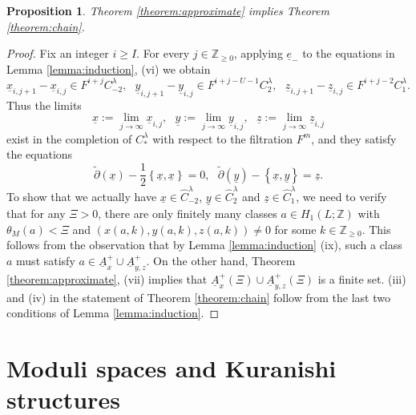\documentclass[a4paper]{article}
\newtheorem{proposition}[theorem]{Proposition}
\numberwithin{equation}{section}
\begin{document}
\begin{proposition}
Theorem \ref{theorem:approximate} implies Theorem \ref{theorem:chain}.
\end{proposition}
\begin{proof}
Fix an integer $i\geq I$. For every $j\in\mathbb{Z}_{\geq0}$, applying $\underline{e}_-$ to the equations in Lemma \ref{lemma:induction}, (vi) we obtain
\begin{equation}
\underline{x}_{i,j+1}-\underline{x}_{i,j}\in F^{i+j}C_{-2}^\lambda,\textrm{ }\underline{y}_{i,j+1}-\underline{y}_{i,j}\in F^{i+j-U-1}C_2^\lambda,\textrm{ }\underline{z}_{i,j+1}-\underline{z}_{i,j}\in F^{i+j-2}C_1^\lambda.
\end{equation}
Thus the limits
\begin{equation}
\underline{x}:=\lim_{j\rightarrow\infty}\underline{x}_{i,j},\textrm{ }\underline{y}:=\lim_{j\rightarrow\infty}\underline{y}_{i,j},\textrm{ }\underline{z}:=\lim_{j\rightarrow\infty}\underline{z}_{i,j}
\end{equation}
exist in the completion of $C_\ast^\lambda$ with respect to the filtration $F^m$, and they satisfy the equations
\begin{equation}
\tilde{\partial}(\underline{x})-\frac{1}{2}\left\{\underline{x},\underline{x}\right\}=0,\textrm{ }\tilde{\partial}(\underline{y})-\left\{\underline{x},\underline{y}\right\}=\underline{z}.
\end{equation}
To show that we actually have $\underline{x}\in\widehat{C}_{-2}^\lambda$, $\underline{y}\in\widehat{C}_2^\lambda$ and $\underline{z}\in\widehat{C}_1^\lambda$, we need to verify that for any $\Xi>0$, there are only finitely many classes $a\in H_1(L;\mathbb{Z})$ with $\theta_M(a)<\Xi$ and $\left(x(a,k),y(a,k),z(a,k)\right)\neq0$ for some $k\in\mathbb{Z}_{\geq0}$. This follows from the observation that by Lemma \ref{lemma:induction} (ix), such a class $a$ must satisfy $a\in\underline{A}_x^+\cup\underline{A}_{y,z}^+$. On the other hand, Theorem \ref{theorem:approximate}, (vii) implies that $\underline{A}_x^+(\Xi)\cup\underline{A}_{y,z}^+(\Xi)$ is a finite set. (iii) and (iv) in the statement of Theorem \ref{theorem:chain} follow from the last two conditions of Lemma \ref{lemma:induction}.
\end{proof}

\section{Moduli spaces and Kuranishi structures}\label{section:moduli}
\end{document}
